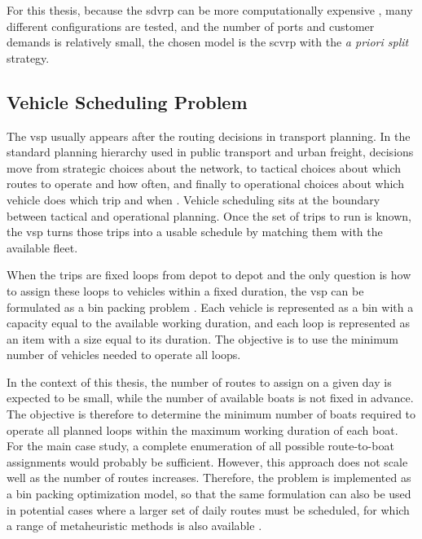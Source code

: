 \documentclass[12pt]{article}
\begin{document}
For this thesis, because the \ac{sdvrp} can be more computationally expensive \parencite{a17090396}, many different configurations are tested, and the number of ports and customer demands is relatively small, the chosen model is the \ac{scvrp} with the \textit{a priori split} strategy.

\subsection{Vehicle Scheduling Problem}
\label{subsec:vehicle-scheduling-problem}

The \ac{vsp} usually appears after the routing decisions in transport planning. In the standard planning hierarchy used in public transport and urban freight, decisions move from strategic choices about the network, to tactical choices about which routes to operate and how often, and finally to operational choices about which vehicle does which trip and when \parencite{ibarra2015planning}. Vehicle scheduling sits at the boundary between tactical and operational planning. Once the set of trips to run is known, the \ac{vsp} turns those trips into a usable schedule by matching them with the available fleet.

When the trips are fixed loops from depot to depot and the only question is how to assign these loops to vehicles within a fixed duration, the \ac{vsp} can be formulated as a bin packing problem \parencite{delorme2016bin}. Each vehicle is represented as a bin with a capacity equal to the available working duration, and each loop is represented as an item with a size equal to its duration. The objective is to use the minimum number of vehicles needed to operate all loops.

In the context of this thesis, the number of routes to assign on a given day is expected to be small, while the number of available boats is not fixed in advance. The objective is therefore to determine the minimum number of boats required to operate all planned loops within the maximum working duration of each boat. For the main case study, a complete enumeration of all possible route-to-boat assignments would probably be sufficient. However, this approach does not scale well as the number of routes increases. Therefore, the problem is implemented as a bin packing optimization model, so that the same formulation can also be used in potential cases where a larger set of daily routes must be scheduled, for which a range of metaheuristic methods is also available \parencite{munien2021metaheuristic}.
\end{document}
